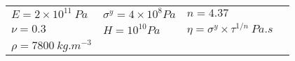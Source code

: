   \begin{tabular}{l|l|lN}
    \hline
    $E=2\times 10^{11}\:Pa$ & $\sigma^y=4 \times 10^8 Pa$ & $n=4.37$&  \\ [3pt]
    $\nu=0.3$ & $H=10^{10} Pa$ & $\eta=\sigma^y \times \tau^{1/n} \: Pa.s$ & \\[3pt]
    $\rho = 7800 \: kg.m^{-3}$ & & &\\[3pt]
    \hline
  \end{tabular}

